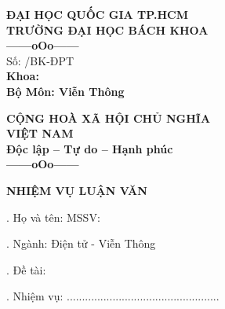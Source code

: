 
\thispagestyle{empty}

\begin{center}
\begin{minipage}[t]{0.48\textwidth}
\centering
\textbf{\small ĐẠI HỌC QUỐC GIA TP.HCM} \\
\textbf{\small TRƯỜNG ĐẠI HỌC BÁCH KHOA} \\
\vspace{0.2cm}
\textbf{\small ------oOo------} \\ %
\vspace{0.2cm}
Số: \underline{\hspace{3cm}} /BK-ĐPT \\[0.2cm]
\textbf{\small Khoa: \DEPARTMENT} \\
\textbf{\small Bộ Môn: Viễn Thông}
\end{minipage}
\hfill
\begin{minipage}[t]{0.48\textwidth}
\centering
\textbf{\small CỘNG HOÀ XÃ HỘI CHỦ NGHĨA} \\
\textbf{\small VIỆT NAM} \\
\textbf{\small Độc lập -- Tự do -- Hạnh phúc} \\
\vspace{0.2cm}
\textbf{\small ------oOo------} %
\end{minipage}
\end{center}

\vspace{0.6cm}

\begin{center}
\textbf{\large NHIỆM VỤ LUẬN VĂN}
\end{center}

\vspace{0.5cm}

. Họ và tên: \TENTACGIA \hspace{2cm} MSSV: \MSSV

\vspace{0.2cm}
. Ngành: Điện tử - Viễn Thông

\vspace{0.2cm}
. Đề tài: \TENLUANVAN

\vspace{0.2cm}
. Nhiệm vụ: .................................................. 

